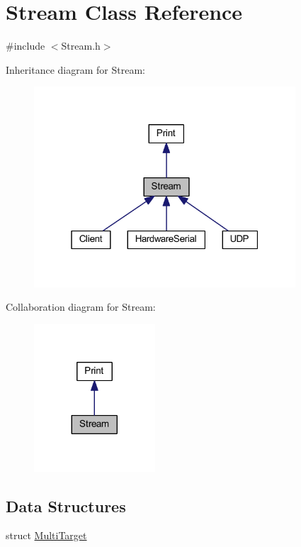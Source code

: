 \hypertarget{class_stream}{}\section{Stream Class Reference}
\label{class_stream}


{\ttfamily \#include $<$Stream.\+h$>$}



Inheritance diagram for Stream\+:\nopagebreak
\begin{figure}[H]
\begin{center}
\leavevmode
\includegraphics[width=277pt]{class_stream__inherit__graph}
\end{center}
\end{figure}


Collaboration diagram for Stream\+:\nopagebreak
\begin{figure}[H]
\begin{center}
\leavevmode
\includegraphics[width=128pt]{class_stream__coll__graph}
\end{center}
\end{figure}
\subsection*{Data Structures}
\begin{DoxyCompactItemize}
\item 
struct \hyperlink{struct_stream_1_1_multi_target}{Multi\+Target}
\end{DoxyCompactItemize}
